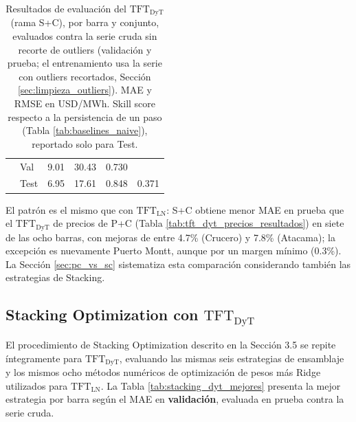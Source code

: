 \begin{table}[htbp]
\begin{tabular}{llrrrr}
            & Val   & 9.01 & 30.43 & 0.730 & \\
            & Test  & 6.95 & 17.61 & 0.848 & 0.371 \\
        \bottomrule
    \end{tabular}
    \vspace{0.2cm}
    \caption{Resultados de evaluación del $\text{TFT}_\text{DyT}$ (rama S+C), por barra y conjunto, evaluados contra la serie cruda sin recorte de outliers (validación y prueba; el entrenamiento usa la serie con outliers recortados, Sección \ref{sec:limpieza_outliers}). MAE y RMSE en USD/MWh. Skill score respecto a la persistencia de un paso (Tabla \ref{tab:baselines_naive}), reportado solo para Test.}
    \label{tab:tft_sc_dyt_resultados}
\end{table}

El patrón es el mismo que con $\text{TFT}_\text{LN}$: S+C obtiene menor MAE en prueba que el $\text{TFT}_\text{DyT}$ de precios de P+C (Tabla \ref{tab:tft_dyt_precios_resultados}) en siete de las ocho barras, con mejoras de entre 4.7\% (Crucero) y 7.8\% (Atacama); la excepción es nuevamente Puerto Montt, aunque por un margen mínimo (0.3\%). La Sección \ref{sec:pc_vs_sc} sistematiza esta comparación considerando también las estrategias de Stacking.

\subsection{Stacking Optimization con $\text{TFT}_\text{DyT}$}

El procedimiento de Stacking Optimization descrito en la Sección 3.5 se repite íntegramente para $\text{TFT}_\text{DyT}$, evaluando las mismas seis estrategias de ensamblaje y los mismos ocho métodos numéricos de optimización de pesos más Ridge utilizados para $\text{TFT}_\text{LN}$. La Tabla \ref{tab:stacking_dyt_mejores} presenta la mejor estrategia por barra según el MAE en \textbf{validación}, evaluada en prueba contra la serie cruda.


